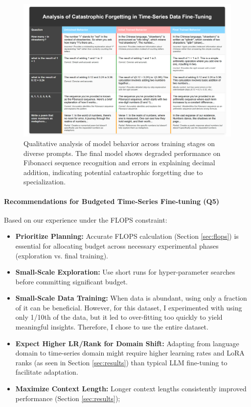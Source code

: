 \documentclass{article}
\begin{document}
\begin{figure}
    \centering
    \includegraphics[width=1\linewidth]{M2 Course Work//Images/Catastropic_Forgetting.png}
    \caption{Qualitative analysis of model behavior across training stages on diverse prompts. The final model shows degraded performance on Fibonacci sequence recognition and errors in explaining decimal addition, indicating potential catastrophic forgetting due to specialization.}
\label{fig:catastrophic_forgetting_analysis}
\end{figure}


\paragraph{Recommendations for Budgeted Time-Series Fine-tuning (Q5)}
Based on our experience under the FLOPS constraint:
\begin{itemize}
    \item \textbf{Prioritize Planning:} Accurate FLOPS calculation (Section \ref{sec:flops}) is essential for allocating budget across necessary experimental phases (exploration vs. final training). 
    \item \textbf{Small-Scale Exploration:} Use short runs for hyper-parameter searches before committing significant budget.
    \item \textbf{Small-Scale Data Training:} When data is abundant, using only a fraction of it can be beneficial. However, for this dataset, I experimented with using only 1/10th of the data, but it led to over-fitting too quickly to yield meaningful insights. Therefore, I chose to use the entire dataset.
    \item \textbf{Expect Higher LR/Rank for Domain Shift:} Adapting from language domain to time-series domain might require higher learning rates and LoRA ranks (as seen in Section \ref{sec:results}) than typical LLM fine-tuning to facilitate adaptation.
    \item \textbf{Maximize Context Length:} Longer context lengths consistently improved performance (Section \ref{sec:results});
\end{itemize}
\end{document}
